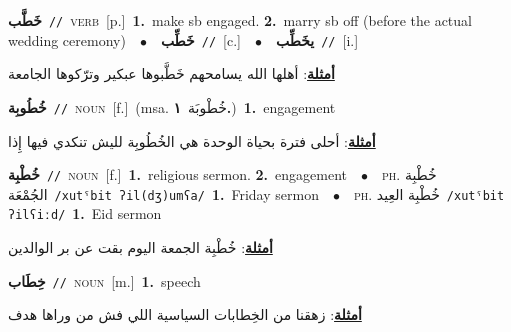 \documentclass[10pt,a4paper,twoside]{article} %
\begin{document}
\begin{multicols}{2}
{\setlength\topsep{0pt}\textbf{\foreignlanguage{arabic}{خَطَّب}}\ {\color{gray}\texttt{//}\color{black}}\ \textsc{verb}\ [p.]\ \textbf{1.}~make sb engaged.  \textbf{2.}~marry sb off (before the actual wedding ceremony)\ \ $\bullet$\ \ \setlength\topsep{0pt}\textbf{\foreignlanguage{arabic}{خَطِّب}}\ {\color{gray}\texttt{//}\color{black}}\ [c.]\ \ $\bullet$\ \ \setlength\topsep{0pt}\textbf{\foreignlanguage{arabic}{يخَطِّب}}\ {\color{gray}\texttt{//}\color{black}}\ [i.]\  \begin{flushright}\color{gray}\foreignlanguage{arabic}{\textbf{\underline{\foreignlanguage{arabic}{أمثلة}}}: أهلها الله يسامحهم خَطَّبوها عبكير وترّكوها الجامعة}\end{flushright}\color{black}} \vspace{2mm}

{\setlength\topsep{0pt}\textbf{\foreignlanguage{arabic}{خُطُوبِة}}\ {\color{gray}\texttt{//}\color{black}}\ \textsc{noun}\ [f.]\ \color{gray}(msa. \foreignlanguage{arabic}{خُطْوبَة}~\foreignlanguage{arabic}{\textbf{١.}})\color{black}\ \textbf{1.}~engagement\  \begin{flushright}\color{gray}\foreignlanguage{arabic}{\textbf{\underline{\foreignlanguage{arabic}{أمثلة}}}: أحلى فترة بحياة الوحدة هي الخُطُوبِة لليش تنكدي فيها إِذا}\end{flushright}\color{black}} \vspace{2mm}

{\setlength\topsep{0pt}\textbf{\foreignlanguage{arabic}{خُطْبِة}}\ {\color{gray}\texttt{//}\color{black}}\ \textsc{noun}\ [f.]\ \textbf{1.}~religious sermon.  \textbf{2.}~engagement\ \ $\bullet$\ \ \textsc{ph.} \color{gray} \foreignlanguage{arabic}{خُطْبِة الجُمْعَة}\color{black}\ {\color{gray}\texttt{/{\sffamily xutˤbit ʔil(dʒ)umʕa}/}\color{black}}\ \textbf{1.}~Friday sermon\ \ $\bullet$\ \ \textsc{ph.} \color{gray} \foreignlanguage{arabic}{خُطْبِة العِيد}\color{black}\ {\color{gray}\texttt{/{\sffamily xutˤbit ʔilʕiːd}/}\color{black}}\ \textbf{1.}~Eid sermon\  \begin{flushright}\color{gray}\foreignlanguage{arabic}{\textbf{\underline{\foreignlanguage{arabic}{أمثلة}}}: خُطْبِة الجمعة اليوم بقت عن بر الوالدين}\end{flushright}\color{black}} \vspace{2mm}

{\setlength\topsep{0pt}\textbf{\foreignlanguage{arabic}{خِطَاب}}\ {\color{gray}\texttt{//}\color{black}}\ \textsc{noun}\ [m.]\ \textbf{1.}~speech\  \begin{flushright}\color{gray}\foreignlanguage{arabic}{\textbf{\underline{\foreignlanguage{arabic}{أمثلة}}}: زهقنا من الخِطابات السياسية اللي فش من وراها هدف}\end{flushright}\color{black}} \vspace{2mm}


\end{multicols}
\end{document}
